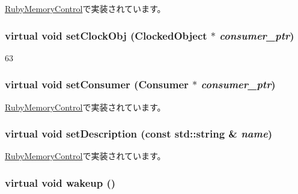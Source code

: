 \hyperlink{classRubyMemoryControl_ad20897c5c8bd47f5d4005989bead0e55}{RubyMemoryControl}で実装されています。\hypertarget{classMemoryControl_a18a6b7f310731164a6a1509768b93eab}{
\subsubsection[{setClockObj}]{\setlength{\rightskip}{0pt plus 5cm}virtual void setClockObj ({\bf ClockedObject} $\ast$ {\em consumer\_\-ptr})}}
\label{classMemoryControl_a18a6b7f310731164a6a1509768b93eab}



\begin{DoxyCode}
63 {}
\end{DoxyCode}
\hypertarget{classMemoryControl_ac57bc43eacdddc1423b4f98ead12fd1c}{
\subsubsection[{setConsumer}]{\setlength{\rightskip}{0pt plus 5cm}virtual void setConsumer ({\bf Consumer} $\ast$ {\em consumer\_\-ptr})}}
\label{classMemoryControl_ac57bc43eacdddc1423b4f98ead12fd1c}


\hyperlink{classRubyMemoryControl_a8487c37680239f103e21ada9acf1726d}{RubyMemoryControl}で実装されています。\hypertarget{classMemoryControl_aaf16ee4e399ebed0a6434dd085a6fc10}{
\subsubsection[{setDescription}]{\setlength{\rightskip}{0pt plus 5cm}virtual void setDescription (const std::string \& {\em name})}}
\label{classMemoryControl_aaf16ee4e399ebed0a6434dd085a6fc10}


\hyperlink{classRubyMemoryControl_a9cdbe64eebafb111a124edec55ed2340}{RubyMemoryControl}で実装されています。\hypertarget{classMemoryControl_a623e3e7d1b1c725d70009f7b01a421b9}{
\subsubsection[{wakeup}]{\setlength{\rightskip}{0pt plus 5cm}virtual void wakeup ()}}
\label{classMemoryControl_a623e3e7d1b1c725d70009f7b01a421b9}


